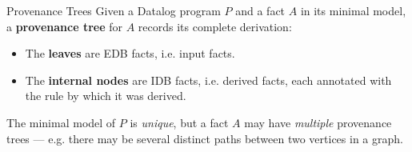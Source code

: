 \begin{frame}{Provenance Trees}
Given a Datalog program $P$ and a fact $A$ in its minimal model, a
\textbf{provenance tree} for $A$ records its complete derivation:

\begin{itemize}
    \item The \textbf{leaves} are EDB facts, i.e. input facts.
    \item The \textbf{internal nodes} are IDB facts, i.e. derived facts,
    each annotated with the rule by which it was derived.
\end{itemize}

\pause

The minimal model of $P$ is \emph{unique}, but a fact $A$ may have
\emph{multiple} provenance trees --- e.g. there may be several distinct paths
between two vertices in a graph.
\end{frame}

